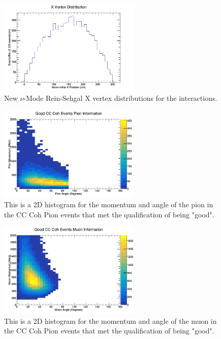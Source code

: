 \documentclass[11pt]{article}
\begin{document}
\begin{figure}[H]
\centering
\includegraphics[width=0.6\textwidth]{NewNMReinSehgalImages/4-XVertexDistributionNMRS.png}
\caption{New $\nu$-Mode Rein-Sehgal X vertex distributions for the interactions.}
\end{figure}

\begin{figure}[H]
\centering
\includegraphics[width=0.6\textwidth]{NewNMReinSehgalImages/5-GoodCCCohPionInfoNMRS.png}
\caption{This is a 2D histogram for the momentum and angle of the pion in the CC Coh Pion events that met the qualification of being "good".}
\end{figure}

\begin{figure}[H]
\centering
\includegraphics[width=0.6\textwidth]{NewNMReinSehgalImages/6-GoodCCCohMuonInfoNMRS.png}
\caption{This is a 2D histogram for the momentum and angle of the muon in the CC Coh Pion events that met the qualification of being "good".}
\end{figure}
\end{document}
